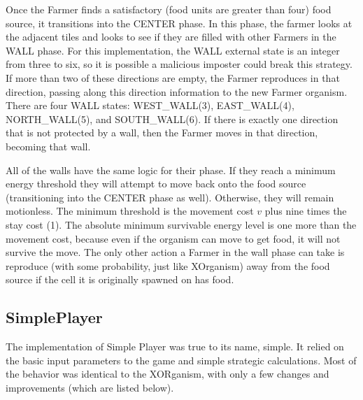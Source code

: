 \documentclass[
10pt, %
letterpaper, %
oneside, %
headinclude,footinclude, %
english
]{article}
\begin{document}
Once the Farmer finds a satisfactory (food units are greater than four) food source, it transitions into the CENTER phase. In this phase, the farmer looks at the adjacent tiles and looks to see if they are filled with other Farmers in the WALL phase. For this implementation, the WALL external state is an integer from three to six, so it is possible a malicious imposter could break this strategy. If more than two of these directions are empty, the Farmer reproduces in that direction, passing along this direction information to the new Farmer organism. There are four WALL states: WEST\_WALL(3), EAST\_WALL(4), NORTH\_WALL(5), and SOUTH\_WALL(6). If there is exactly one direction that is not protected by a wall, then the Farmer moves in that direction, becoming that wall.

All of the walls have the same logic for their phase. If they reach a minimum energy threshold they will attempt to move back onto the food source (transitioning into the CENTER phase as well). Otherwise, they will remain motionless. The minimum threshold is the movement cost $v$ plus nine times the stay cost (1). The absolute minimum survivable energy level is one more than the movement cost, because even if the organism can move to get food, it will not survive the move. The only other action a Farmer in the wall phase can take is reproduce (with some probability, just like XOrganism) away from the food source if the cell it is originally spawned on has food.

\subsection{SimplePlayer}
The implementation of Simple Player was true to its name, simple. It relied on the basic input parameters to the game and simple strategic calculations. Most of the behavior was identical to the XORganism, with only a few changes and improvements (which are listed below).
\end{document}

